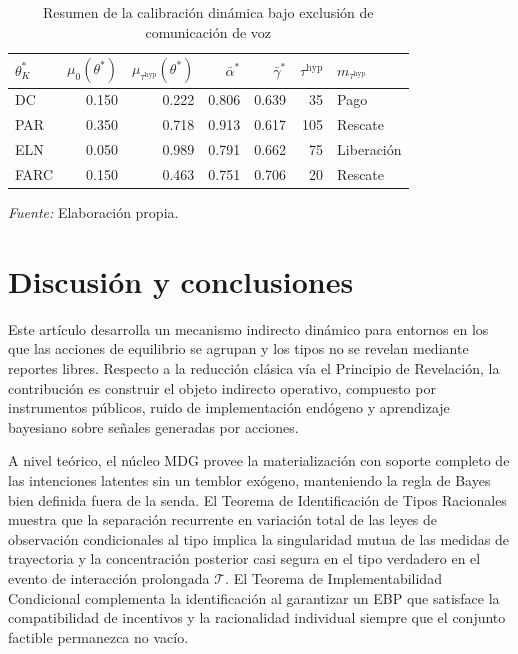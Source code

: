 \documentclass[review,authoryear,12pt]{elsarticle}
\theoremstyle{plain}
\theoremstyle{definition}
\newcommand{\1}{\mathbf{1}}
\begin{document}
\begin{table}[!ht]
\centering
\caption{Resumen de la calibración dinámica bajo exclusión de comunicación de voz}
\label{tab:calibracion-resumen-novoice}
\small
\begin{tabular}{lrrrrrl}
\toprule
$\theta_K^\ast$ & $\mu_0(\theta^\ast)$ & $\mu_{\tau^{\mathrm{hyp}}}(\theta^\ast)$ & $\bar{\alpha}^\ast$ & $\bar{\gamma}^\ast$ & $\tau^{\mathrm{hyp}}$ & $m_{\tau^{\mathrm{hyp}}}$ \\
\midrule
DC & 0.150 & 0.222 & 0.806 & 0.639 & 35 & Pago \\
PAR & 0.350 & 0.718 & 0.913 & 0.617 & 105 & Rescate \\
ELN & 0.050 & 0.989 & 0.791 & 0.662 & 75 & Liberación \\
FARC & 0.150 & 0.463 & 0.751 & 0.706 & 20 & Rescate \\
\bottomrule
\end{tabular}
\par\smallskip\footnotesize \textit{Fuente:} Elaboración propia.
\end{table}

\section{Discusión y conclusiones}\label{sec:conclusiones}

Este artículo desarrolla un mecanismo indirecto dinámico para entornos en los que las acciones de equilibrio se agrupan y los tipos no se revelan mediante reportes libres. Respecto a la reducción clásica vía el Principio de Revelación, la contribución es construir el objeto indirecto operativo, compuesto por instrumentos públicos, ruido de implementación endógeno y aprendizaje bayesiano sobre señales generadas por acciones.

A nivel teórico, el núcleo MDG provee la materialización con soporte completo de las intenciones latentes sin un temblor exógeno, manteniendo la regla de Bayes bien definida fuera de la senda. El Teorema de Identificación de Tipos Racionales muestra que la separación recurrente en variación total de las leyes de observación condicionales al tipo implica la singularidad mutua de las medidas de trayectoria y la concentración posterior casi segura en el tipo verdadero en el evento de interacción prolongada $\mathcal{T}$. El Teorema de Implementabilidad Condicional complementa la identificación al garantizar un EBP que satisface la compatibilidad de incentivos y la racionalidad individual siempre que el conjunto factible permanezca no vacío.
\end{document}
